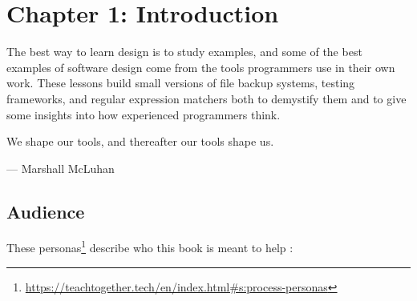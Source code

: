 \documentclass{scrbook}
\newcommand{\hreffoot}[2]{{#1}\footnote{\href{#2}{#2}}}
\begin{document}

\date{}
\maketitle
\frontmatter
\tableofcontents
\mainmatter

\chapter{Chapter 1: Introduction}\label{introduction}


The best way to learn design is to study examples,
and some of the best examples of software design come from
the tools programmers use in their own work.
These lessons build small versions of file backup systems,
testing frameworks,
and regular expression matchers
both to demystify them
and to give some insights into how experienced programmers think.

\begin{callout}


We shape our tools, and thereafter our tools shape us.


— Marshall McLuhan

\end{callout}

\section{Audience}\label{introduction-audience}


These \hreffoot{personas}{https://teachtogether.tech/en/index.html\#s:process-personas} describe who this book is meant to help \cite{Wilson2019}:
\end{document}
